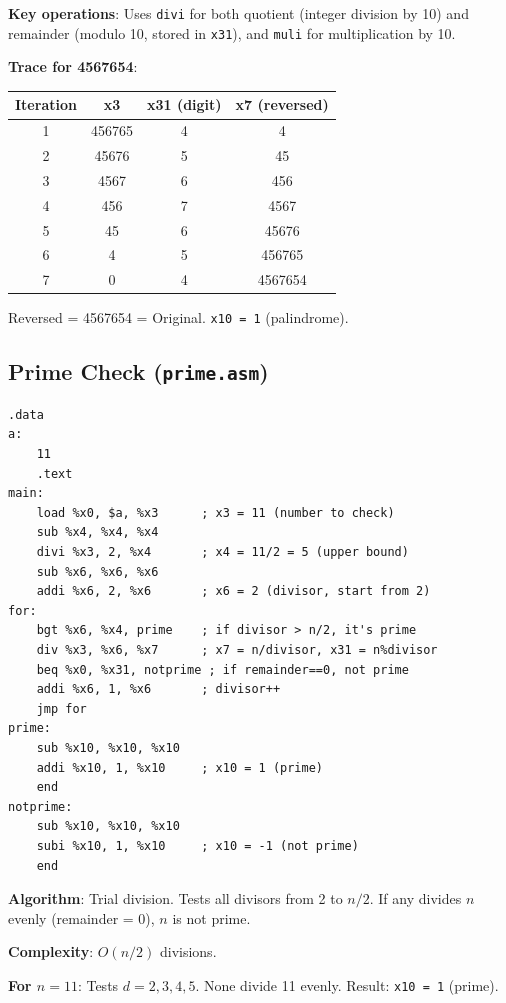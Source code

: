 \documentclass[12pt,a4paper]{article}
\begin{document}
\textbf{Key operations}: Uses \texttt{divi} for both quotient (integer division by 10) and remainder (modulo 10, stored in \texttt{x31}), and \texttt{muli} for multiplication by 10.

\textbf{Trace for 4567654}:
\begin{center}
\begin{tabular}{cccc}
\toprule
\textbf{Iteration} & \textbf{x3} & \textbf{x31 (digit)} & \textbf{x7 (reversed)} \\
\midrule
1 & 456765 & 4 & 4 \\
2 & 45676 & 5 & 45 \\
3 & 4567 & 6 & 456 \\
4 & 456 & 7 & 4567 \\
5 & 45 & 6 & 45676 \\
6 & 4 & 5 & 456765 \\
7 & 0 & 4 & 4567654 \\
\bottomrule
\end{tabular}
\end{center}

Reversed = 4567654 = Original. \texttt{x10 = 1} (palindrome).

\subsection{Prime Check (\texttt{prime.asm})}

\begin{lstlisting}[style=asmstyle, caption={prime.asm}]
.data
a:
    11
    .text
main:
    load %x0, $a, %x3      ; x3 = 11 (number to check)
    sub %x4, %x4, %x4
    divi %x3, 2, %x4       ; x4 = 11/2 = 5 (upper bound)
    sub %x6, %x6, %x6
    addi %x6, 2, %x6       ; x6 = 2 (divisor, start from 2)
for:
    bgt %x6, %x4, prime    ; if divisor > n/2, it's prime
    div %x3, %x6, %x7      ; x7 = n/divisor, x31 = n%divisor
    beq %x0, %x31, notprime ; if remainder==0, not prime
    addi %x6, 1, %x6       ; divisor++
    jmp for
prime:
    sub %x10, %x10, %x10
    addi %x10, 1, %x10     ; x10 = 1 (prime)
    end
notprime:
    sub %x10, %x10, %x10
    subi %x10, 1, %x10     ; x10 = -1 (not prime)
    end
\end{lstlisting}

\textbf{Algorithm}: Trial division. Tests all divisors from 2 to $n/2$. If any divides $n$ evenly (remainder = 0), $n$ is not prime.

\textbf{Complexity}: $O(n/2)$ divisions.

\textbf{For $n = 11$}: Tests $d = 2, 3, 4, 5$. None divide 11 evenly. Result: \texttt{x10 = 1} (prime).
\end{document}
